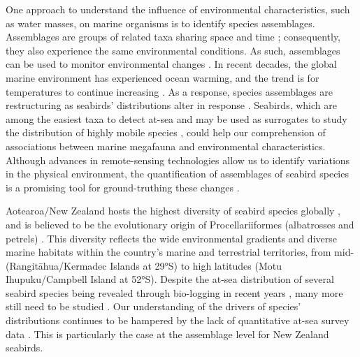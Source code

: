 \documentclass[preprint, 3p, authoryear]{elsarticle} %
\begin{document}
One approach to understand the influence of environmental characteristics, such as water masses, on marine organisms is to identify species assemblages. Assemblages are groups of related taxa sharing space and time \citep{stroud2015}; consequently, they also experience the same environmental conditions. As such, assemblages can be used to monitor environmental changes \citep{ferrier2002, woolley2020}. In recent decades, the global marine environment has experienced ocean warming, and the trend is for temperatures to continue increasing \citep{cheng2022}. As a response, species assemblages are restructuring \citep{antao2020, bernardo2024, leluherne2024} as seabirds' distributions alter in response \citep{peron2010, sojitra2022}. Seabirds, which are among the easiest taxa to detect at-sea \citep{ballance2007} and may be used as surrogates to study the distribution of highly mobile species \citep{daudt2024}, could help our comprehension of associations between marine megafauna and environmental characteristics. Although advances in remote-sensing technologies allow us to identify variations in the physical environment, the quantification of assemblages of seabird species is a promising tool for ground-truthing these changes \citep{gremillet2009}.

Aotearoa/New Zealand hosts the highest diversity of seabird species globally \citep{karpouzi2007, ramirez2017}, and is believed to be the evolutionary origin of Procellariiformes (albatrosses and petrels) \citep{chown1998}. This diversity reflects the wide environmental gradients and diverse marine habitats within the country's marine and terrestrial territories, from mid- (Rangitāhua/Kermadec Islands at 29°S) to high latitudes (Motu Ihupuku/Campbell Island at 52°S). Despite the at-sea distribution of several seabird species being revealed through bio-logging in recent years \citep[e.g.][]{shaffer2006, rayner2011, thompson2021, fischer2023}, many more still need to be studied \citep{bernard2021}. Our understanding of the drivers of species' distributions continues to be hampered by the lack of quantitative at-sea survey data \citep{mott2018}. This is particularly the case at the assemblage level for New Zealand seabirds.
\end{document}
